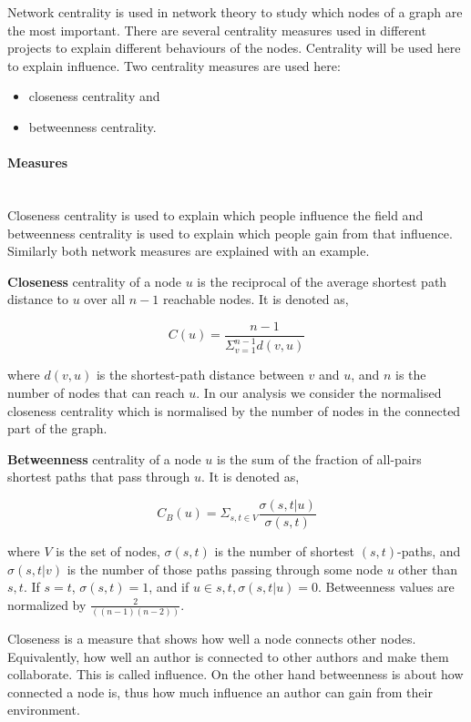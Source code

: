 \documentclass{article}
\begin{document}
Network centrality is used in network theory to study which nodes of a graph are
the most important. There are several centrality measures used in different
projects to explain different behaviours of the nodes. Centrality will be used
here to explain influence. Two centrality measures are used here:

\begin{itemize}
    \item closeness centrality and
    \item betweenness centrality.
\end{itemize}

\paragraph{Measures}
\mbox{ }\\

Closeness centrality is used to explain which people influence the field and
betweenness centrality is used to explain which people gain from that influence.
Similarly both network measures are explained with an example.

\textbf{Closeness} centrality of a node \(u\) is the reciprocal of the average
shortest path distance to \(u\) over all \(n-1\) reachable nodes. It is denoted as,

\[C(u)= \frac{n - 1}{\displaystyle \Sigma_{v=1}^{n-1}d(v, u)}\]

where \(d(v, u)\) is the shortest-path distance between \(v\) and \(u\), and \(n\)
is the number of nodes that can reach \(u\). In our analysis we consider the
normalised closeness centrality which is normalised by the number of nodes in the
connected part of the graph.

\textbf{Betweenness} centrality of a node \(u\) is the sum of the fraction of all-pairs
shortest paths that pass through \(u\). It is denoted as,

\[ C_B(u)=\Sigma_{s,t \in V} \frac{\sigma (s,t|u)}{\sigma(s,t)}\]

where \(V\) is the set of nodes, \(\sigma(s,t)\) is the number of shortest \((s,t)\)-paths,
and \(\sigma(s,t|v)\) is the number of those paths passing through some node
\(u\) other than \(s,t\). If \(s=t\), \(\sigma(s,t)=1\), and if \(u \in s,t, \sigma(s,t|u)=0\).
Betweenness values are normalized by \(\frac{2}{((n-1)(n-2))}\).

Closeness is a measure that shows how well a node connects other nodes. Equivalently,
how well an author is connected to other authors and make them collaborate. 
This is called influence. On the other hand betweenness is about how connected a
node is, thus how much influence an author can gain from their environment.
\end{document}
